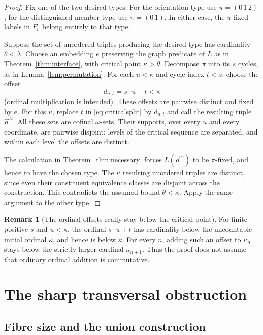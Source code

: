 \documentclass[11pt,letterpaper]{article}
\theoremstyle{definition}
\newtheorem{remark}[definition]{Remark}
\numberwithin{equation}{section}
\begin{document}
\begin{proof}
Fix one of the two desired types. For the orientation type use $\pi=(0\,1\,2)$; for the distinguished-member type use $\pi=(0\,1)$. In either case, the $\pi$-fixed labels in $F_5$ belong entirely to that type.

Suppose the set of unordered triples producing the desired type has cardinality $\theta<\lambda$. Choose an embedding $e$ preserving the graph predicate of $L$ as in Theorem~\ref{thm:interface}, with critical point $\kappa>\theta$. Decompose $\pi$ into its $s$ cycles, as in Lemma~\ref{lem:permutation}. For each $u<\kappa$ and cycle index $t<s$, choose the offset
\[
 d_{u,t}=s\cdot u+t<\kappa
\]
(ordinal multiplication is intended). These offsets are pairwise distinct and fixed by $e$. For this $u$, replace $t$ in \eqref{eq:criticalsplit} by $d_{u,t}$ and call the resulting tuple $\vec a^{\,u}$. All these sets are cofinal $\omega$-sets. Their supports, over every $u$ and every coordinate, are pairwise disjoint: levels of the critical sequence are separated, and within each level the offsets are distinct.

The calculation in Theorem~\ref{thm:necessary} forces $L(\vec a^{\,u})$ to be $\pi$-fixed, and hence to have the chosen type. The $\kappa$ resulting unordered triples are distinct, since even their constituent equivalence classes are disjoint across the construction. This contradicts the assumed bound $\theta<\kappa$. Apply the same argument to the other type.
\end{proof}

\begin{remark}[The ordinal offsets really stay below the critical point]
For finite positive $s$ and $u<\kappa$, the ordinal $s\cdot u+t$ has cardinality below the uncountable initial ordinal $\kappa$, and hence is below $\kappa$. For every $n$, adding such an offset to $\kappa_n$ stays below the strictly larger cardinal $\kappa_{n+1}$. Thus the proof does not assume that ordinary ordinal addition is commutative.
\end{remark}

\section{The sharp transversal obstruction}\label{sec:transversals}

\subsection{Fibre size and the union construction}
\end{document}
